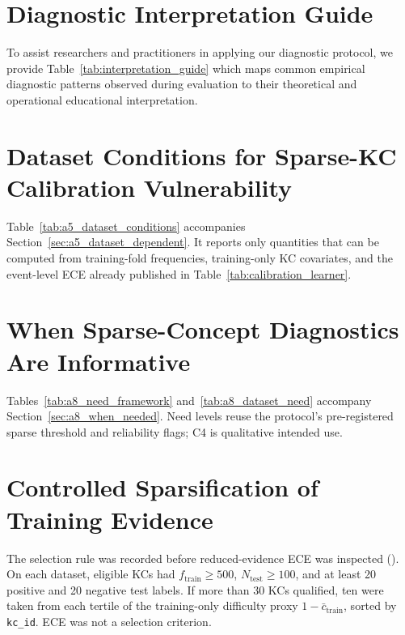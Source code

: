 

\clearpage

\section{Diagnostic Interpretation Guide}
\label{app:interpretation}
To assist researchers and practitioners in applying our diagnostic protocol, we provide Table~\ref{tab:interpretation_guide} which maps common empirical diagnostic patterns observed during evaluation to their theoretical and operational educational interpretation.



\section{Dataset Conditions for Sparse-KC Calibration Vulnerability}
\label{app:dataset_conditions}
Table~\ref{tab:a5_dataset_conditions} accompanies Section~\ref{sec:a5_dataset_dependent}. It reports only quantities that can be computed from training-fold frequencies, training-only KC covariates, and the event-level ECE already published in Table~\ref{tab:calibration_learner}.



\section{When Sparse-Concept Diagnostics Are Informative}
\label{app:a8_need}
Tables~\ref{tab:a8_need_framework} and~\ref{tab:a8_dataset_need} accompany Section~\ref{sec:a8_when_needed}. Need levels reuse the protocol's pre-registered sparse threshold and reliability flags; C4 is qualitative intended use.




\section{Controlled Sparsification of Training Evidence}
\label{app:a9_sparsify}
The selection rule was recorded before reduced-evidence ECE was inspected ().
On each dataset, eligible KCs had $f_{\mathrm{train}}\ge 500$, $N_{\mathrm{test}}\ge 100$, and at least 20 positive and 20 negative test labels.
If more than 30 KCs qualified, ten were taken from each tertile of the training-only difficulty proxy $1-\bar{c}_{\mathrm{train}}$, sorted by \texttt{kc\_id}.
ECE was not a selection criterion.

